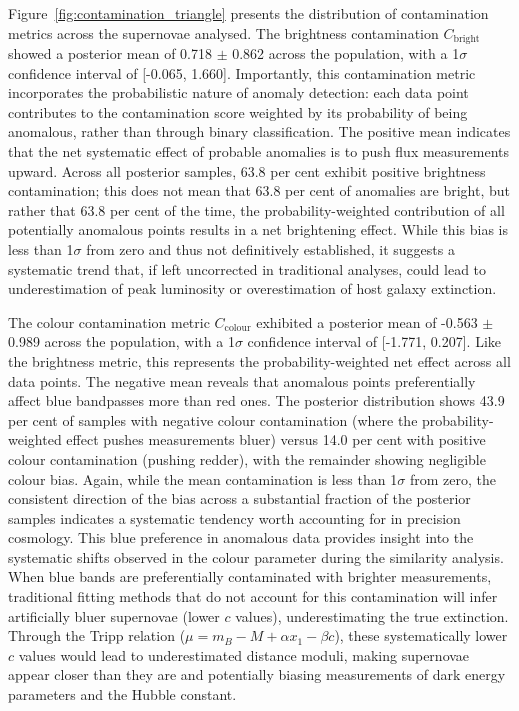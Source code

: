 Figure~\ref{fig:contamination_triangle} presents the distribution of contamination metrics across the supernovae analysed. The brightness contamination $C_{\mathrm{bright}}$ showed a posterior mean of 0.718 $\pm$ 0.862 across the population, with a 1$\sigma$ confidence interval of [-0.065, 1.660]. Importantly, this contamination metric incorporates the probabilistic nature of anomaly detection: each data point contributes to the contamination score weighted by its probability of being anomalous, rather than through binary classification. The positive mean indicates that the net systematic effect of probable anomalies is to push flux measurements upward. Across all posterior samples, 63.8 per cent exhibit positive brightness contamination; this does not mean that 63.8 per cent of anomalies are bright, but rather that 63.8 per cent of the time, the probability-weighted contribution of all potentially anomalous points results in a net brightening effect. While this bias is less than 1$\sigma$ from zero and thus not definitively established, it suggests a systematic trend that, if left uncorrected in traditional analyses, could lead to underestimation of peak luminosity or overestimation of host galaxy extinction.

The colour contamination metric $C_{\mathrm{colour}}$ exhibited a posterior mean of -0.563 $\pm$ 0.989 across the population, with a 1$\sigma$ confidence interval of [-1.771, 0.207]. Like the brightness metric, this represents the probability-weighted net effect across all data points. The negative mean reveals that anomalous points preferentially affect blue bandpasses more than red ones. The posterior distribution shows 43.9 per cent of samples with negative colour contamination (where the probability-weighted effect pushes measurements bluer) versus 14.0 per cent with positive colour contamination (pushing redder), with the remainder showing negligible colour bias. Again, while the mean contamination is less than 1$\sigma$ from zero, the consistent direction of the bias across a substantial fraction of the posterior samples indicates a systematic tendency worth accounting for in precision cosmology. This blue preference in anomalous data provides insight into the systematic shifts observed in the colour parameter during the similarity analysis. When blue bands are preferentially contaminated with brighter measurements, traditional fitting methods that do not account for this contamination will infer artificially bluer supernovae (lower $c$ values), underestimating the true extinction. Through the Tripp relation ($\mu = m_B - M + \alpha x_1 - \beta c$), these systematically lower $c$ values would lead to underestimated distance moduli, making supernovae appear closer than they are and potentially biasing measurements of dark energy parameters and the Hubble constant.


